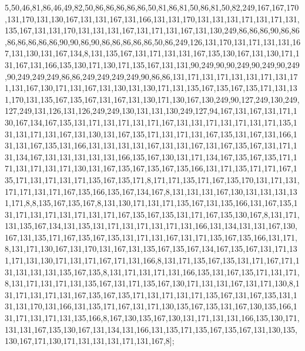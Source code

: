 5,50,46,81,86,46,49,82,50,86,86,86,86,86,50,81,86,81,50,86,81,50,82,249,167,167,170,131,170,131,130,167,131,131,167,131,166,131,131,170,131,131,131,171,131,171,131,135,167,131,131,170,131,131,131,167,131,171,131,167,131,130,249,86,86,86,90,86,86,86,86,86,86,86,90,90,86,90,86,86,86,86,86,50,86,249,126,131,170,131,171,131,131,167,131,130,131,167,134,8,131,135,167,131,171,131,131,167,135,130,167,131,130,171,131,167,131,166,135,130,171,130,171,135,167,131,131,90,249,90,90,249,90,249,90,249,90,249,249,249,86,86,249,249,249,249,90,86,86,131,171,131,171,131,131,171,131,171,131,167,130,171,131,167,131,130,131,130,171,131,135,167,135,167,135,171,131,131,170,131,135,167,135,167,131,167,131,130,171,130,167,130,249,90,127,249,130,249,127,249,131,126,131,126,249,249,130,131,131,130,249,127,94,167,131,167,131,171,130,167,134,167,135,131,171,131,171,131,171,167,131,131,171,131,171,131,171,135,131,131,171,131,167,131,130,131,167,135,171,131,171,131,167,135,131,167,131,166,131,131,167,135,131,166,131,131,131,131,167,131,131,167,131,167,135,167,131,171,131,134,167,131,131,131,131,131,166,135,167,130,131,171,134,167,135,167,135,171,171,131,171,131,171,130,131,167,135,167,135,167,135,166,131,171,135,171,171,167,135,171,131,171,131,171,135,167,135,171,8,171,171,135,171,167,135,170,131,171,131,171,171,131,171,167,135,166,135,167,134,167,8,131,131,131,167,130,131,131,131,131,171,8,8,135,167,135,167,8,131,130,171,131,171,135,167,131,135,166,131,167,135,131,171,131,171,131,171,131,171,167,135,167,135,131,171,167,135,130,167,8,131,171,131,135,167,134,131,135,131,171,131,171,131,171,131,166,131,134,131,131,167,130,167,131,135,171,167,135,167,135,131,171,131,167,131,171,135,167,135,166,131,171,8,131,171,130,167,131,170,131,167,131,135,167,135,167,134,167,135,167,131,171,131,171,131,130,171,131,171,167,171,131,166,8,131,171,135,167,135,131,171,167,171,131,131,131,131,135,167,135,8,131,171,131,171,131,166,135,131,167,135,171,131,171,8,131,171,131,171,131,135,167,131,171,135,167,130,171,131,131,167,131,171,130,8,131,171,131,171,131,167,135,167,135,171,131,171,131,171,135,167,131,167,135,131,131,131,170,131,166,131,135,171,167,131,171,130,135,167,135,131,167,130,135,166,131,171,131,171,131,135,166,8,167,130,135,167,130,131,171,131,131,166,135,130,171,131,131,167,135,130,167,131,134,131,166,131,135,171,135,167,135,167,131,130,135,130,167,171,130,171,131,131,131,171,131,167,8];
 

